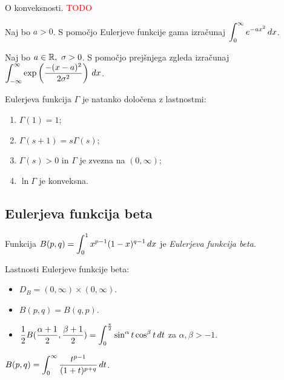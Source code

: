 \begin{opomba}
    O konveksnosti. \textcolor{red}{TODO}
\end{opomba}

\begin{zgled}
    Naj bo \(a>0\). S pomočjo Eulerjeve funkcije gama izračunaj \(\displaystyle \int_{0}^{\infty} e ^{-ax^2} \, dx\).
\end{zgled}

\begin{zgled}
    Naj bo \(a \in \mathbb{R}, \ \sigma > 0\). S pomočjo prejšnjega zgleda izračunaj \(\displaystyle \int_{-\infty}^{\infty} \exp \left(\frac{-(x-a)^2}{2\sigma^2}\right) \, dx\).
\end{zgled}

\begin{izrek}
    Eulerjeva funkcija \(\Gamma\) je natanko določena z lastnostmi:
    \begin{enumerate}
        \item \(\Gamma(1) = 1\);
        \item \(\Gamma(s+1) = s \Gamma(s)\);
        \item \(\Gamma(s)>0\) in \(\Gamma\) je zvezna na \((0, \infty)\);
        \item \(\ln \Gamma\) je konveksna.
    \end{enumerate}
\end{izrek}

\subsection{Eulerjeva funkcija beta}
\begin{definicija}
    Funkcija \(\displaystyle B(p,q) = \int_{0}^{1}x^{p-1}(1-x)^{q-1} \, dx\) je \emph{Eulerjeva funkcija beta}.
\end{definicija}

\begin{trditev}
    Lastnosti Eulerjeve funkcije beta:
    \begin{itemize}
        \item \(D_B = (0, \infty) \times (0, \infty)\).
        \item \(B(p,q) = B(q,p)\).
        \item \(\displaystyle \frac{1}{2} B(\frac{\alpha + 1}{2}, \frac{\beta + 1}{2}) = \int_{0}^{\frac{\pi}{2}} \sin^\alpha t \cos^\beta t \, dt\) za \(\alpha, \beta > -1\).
    \end{itemize}
\end{trditev}

\begin{trditev}
    \(\displaystyle B(p,q) = \int_{0}^{\infty} \frac{t^{p-1}}{(1+t)^{p+q}} \, dt\).
\end{trditev}

